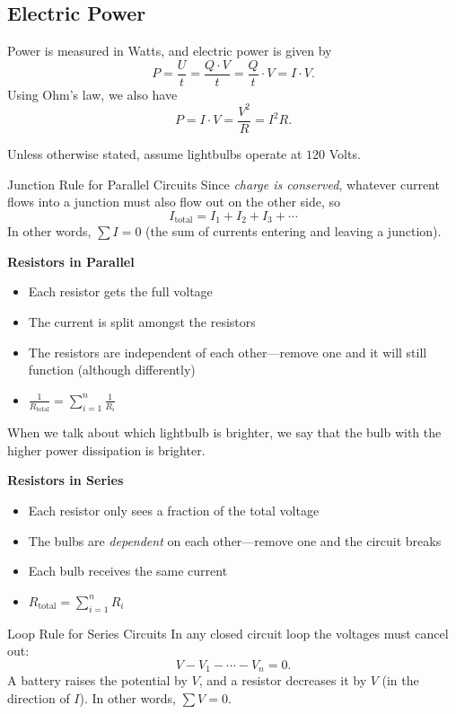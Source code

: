 \documentclass[class=article, crop=false]{standalone}
\begin{document}
  \subsection{Electric Power}
  Power is measured in Watts, and electric power is given by
  \[
    P = \frac{U}{t} = \frac{Q\cdot V}{t} = \frac{Q}{t}\cdot V = I\cdot V.
  \]
  Using Ohm's law, we also have
  \[
    P = I\cdot V = \frac{V^2}{R} = I^2R.
  \]
  \begin{note}{}
    Unless otherwise stated, assume lightbulbs operate at $120$ Volts.
  \end{note}
  \begin{theorem}{Junction Rule for Parallel Circuits}
    Since \emph{charge is conserved}, whatever current flows into a junction must also flow out on the other side, so
    \[
      I_{\text{total}} = I_1 + I_2 + I_3 + \dotsb
    \]
    In other words, $\sum I = 0$ (the sum of currents entering and leaving a junction).
  \end{theorem}
  \textbf{Resistors in Parallel}
  \begin{itemize}
    \item Each resistor gets the full voltage
    \item The current is split amongst the resistors
    \item The resistors are independent of each other---remove one and it will still function (although differently)
    \item $\frac{1}{R_{\text{total}}} = \sum_{i=1}^{n} \frac{1}{R_i}$
  \end{itemize}
  \begin{note}{}
    When we talk about which lightbulb is brighter, we say that the bulb with the higher power dissipation is brighter.
  \end{note}
  \textbf{Resistors in Series}
  \begin{itemize}
    \item Each resistor only sees a fraction of the total voltage
    \item The bulbs are \emph{dependent} on each other---remove one and the circuit breaks
    \item Each bulb receives the same current
    \item $R_{\text{total}} = \sum_{i=1}^{n}R_i$
  \end{itemize}
  \begin{theorem}{Loop Rule for Series Circuits}
    In any closed circuit loop the voltages must cancel out:
    \[
      V - V_1 - \dotsb - V_n = 0.
    \]
    A battery raises the potential by $V$, and a resistor decreases it by $V$ (in the direction of $I$). In other words, $\sum V = 0$.
  \end{theorem}
\end{document}
